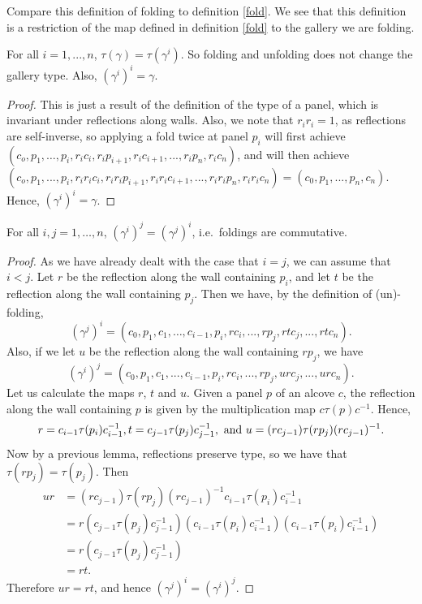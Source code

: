 \documentclass[11pt]{article}
\begin{document}
Compare this definition of folding to definition \ref{fold}. We see that this definition is a restriction of the map defined in definition \ref{fold} to the gallery we are folding. 
\begin{lemma}
    For all $i=1,...,n$, $\tau(\gamma)=\tau(\gamma^i)$. So folding and unfolding does not change the gallery type. Also, $(\gamma^i)^i=\gamma$.
\end{lemma}

\begin{proof}
    This is just a result of the definition of the type of a panel, which is invariant under reflections along walls. Also, we note that $r_ir_i=1$, as reflections are self-inverse, so applying a fold twice at panel $p_i$ will first achieve $(c_o,p_1,\hdots,p_i,r_ic_i,r_ip_{i+1},r_ic_{i+1},...,r_ip_n,r_ic_n)$, and will then achieve $(c_o,p_1,...,p_i,r_ir_ic_i,r_ir_ip_{i+1},r_ir_ic_{i+1},...,r_ir_ip_n,r_ir_ic_n)=(c_0,p_1,...,p_n,c_n)$. Hence, $(\gamma^i)^i=\gamma$.
\end{proof}

\begin{lemma}
    For all $i,j=1,\hdots,n$, $(\gamma^i)^j=(\gamma^j)^i$, i.e.\ foldings are commutative.
\end{lemma}

\begin{proof}
    As we have already dealt with the case that $i=j$, we can assume that $i<j$. Let $r$ be the reflection along the wall containing $p_i$, and let $t$ be the reflection along the wall containing $p_j$. Then we have, by the definition of (un)-folding,
    \[(\gamma^j)^i=(c_0,p_1,c_1,\hdots,c_{i-1},p_i,rc_i,...,rp_j,rtc_j,...,rtc_n).\]
    Also, if we let $u$ be the reflection along the wall containing $rp_j$, we have
    \[(\gamma^i)^j=(c_0,p_1,c_1,...,c_{i-1},p_i,rc_i,...,rp_j,urc_j,...,urc_n).\]
    Let us calculate the maps $r$, $t$ and $u$. Given a panel $p$ of an alcove $c$, the reflection along the wall containing $p$ is given by the multiplication map $c\tau(p)c^{-1}$. Hence,
    \[r=c_{i-1}\tau(p_i)c_{i-1}^{-1}, t=c_{j-1}\tau(p_j)c_{j-1}^{-1}, \textnormal{ and } u=(rc_{j-1})\tau(rp_j)(rc_{j-1})^{-1}.\]
    Now by a previous lemma, reflections preserve type, so we have that $\tau(rp_j)=\tau(p_j)$. Then
    \[\begin{aligned}
        ur & =(rc_{j-1})\tau(rp_j)(rc_{j-1})^{-1}c_{i-1}\tau(p_i)c_{i-1}^{-1}\\
           & =r(c_{j-1}\tau(p_j)c_{j-1}^{-1})(c_{i-1}\tau(p_i)c_{i-1}^{-1})(c_{i-1}\tau(p_i)c_{i-1}^{-1})\\
           & = r(c_{j-1}\tau(p_j)c_{j-1}^{-1})\\
           & =rt.
    \end{aligned}\]
    Therefore $ur=rt$, and hence $(\gamma^j)^i=(\gamma^i)^j$.
\end{proof}
\end{document}
